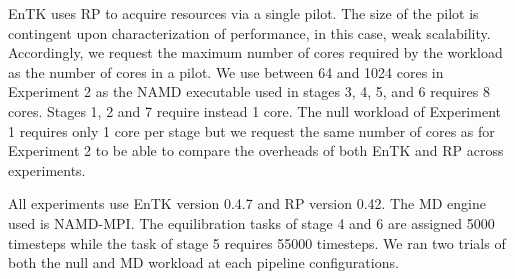 \documentclass{bmcart}
\begin{document}

EnTK uses RP to acquire resources via a single pilot. The size of the pilot
is contingent upon characterization of performance, in this case, weak
scalability. Accordingly, we request the maximum number of cores required by
the workload as the number of cores in a pilot. We use between 64 and 1024
cores in Experiment 2 as the NAMD executable used in stages 3, 4, 5, and 6
requires 8 cores. Stages 1, 2 and 7 require instead 1 core. The null workload
of Experiment 1 requires only 1 core per stage but we request the same number
of cores as for Experiment 2 to be able to compare the overheads of both EnTK
and RP across experiments.

All experiments use EnTK version 0.4.7 and RP version 0.42. The MD engine
used is NAMD-MPI\@. The equilibration tasks of stage 4 and 6 are assigned
5000 timesteps while the task of stage 5 requires 55000 timesteps. We ran two
trials of both the null and MD workload at each pipeline configurations.
\end{document}
